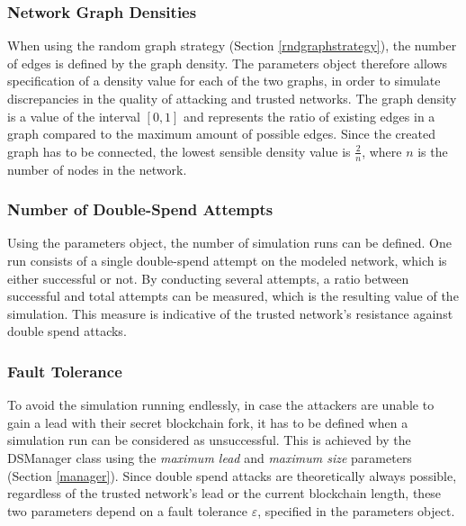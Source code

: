 \documentclass[a4paper,12pt,twoside]{report}
\begin{document}
\subsubsection{Network Graph Densities}
When using the random graph strategy (Section \ref{rndgraphstrategy}), the number of edges is defined by the graph density. The parameters object therefore allows specification of a density value for each of the two graphs, in order to simulate 
discrepancies in the quality of attacking and trusted networks. The graph density is a value of the interval $[0,1]$ and represents the ratio of existing edges in a graph compared to the maximum amount of possible edges. Since the created graph has to be connected, the lowest sensible density value is $\frac{2}{n}$, where $n$ is the number of nodes in the network.
\subsubsection{Number of Double-Spend Attempts}
Using the parameters object, the number of simulation runs can be defined. One run consists of a single double-spend attempt on the modeled network, which is either successful or not. By conducting several attempts, a ratio between successful and total attempts can be measured, which is the resulting value of the simulation. This measure is indicative of the trusted network's resistance against double spend attacks.
\subsubsection{Fault Tolerance}\label{faulttolerance}
To avoid the simulation running endlessly, in case the attackers are unable to gain a lead with their secret blockchain fork, it has to be defined when a simulation run can be considered as unsuccessful. This is achieved by the DSManager class using the \textit{maximum lead} and \textit{maximum size} parameters (Section \ref{manager}). Since double spend attacks are theoretically always possible, regardless of the trusted network's lead or the current blockchain length, these two parameters depend on a fault tolerance $\varepsilon$, specified in the parameters object.
\end{document}
